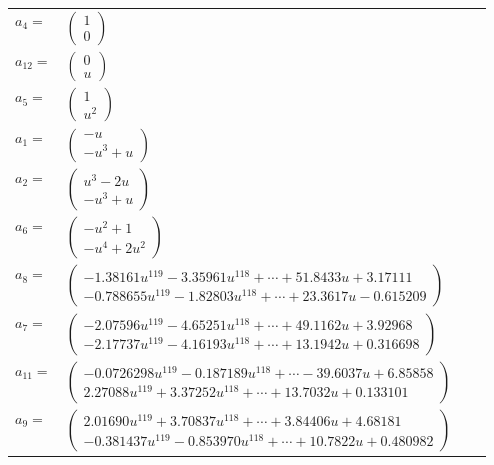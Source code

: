 \documentclass[1p]{elsarticle_modified}
\theoremstyle{definition}
\begin{document}
\begin{tabular}{m{7pt} m{180pt} m{7pt} m{180pt} }
\flushright $a_{4}=$&$\begin{pmatrix}1\\0\end{pmatrix}$ \\
\flushright $a_{12}=$&$\begin{pmatrix}0\\u\end{pmatrix}$ \\
\flushright $a_{5}=$&$\begin{pmatrix}1\\u^2\end{pmatrix}$ \\
\flushright $a_{1}=$&$\begin{pmatrix}- u\\- u^3+u\end{pmatrix}$ \\
\flushright $a_{2}=$&$\begin{pmatrix}u^3-2 u\\- u^3+u\end{pmatrix}$ \\
\flushright $a_{6}=$&$\begin{pmatrix}- u^2+1\\- u^4+2 u^2\end{pmatrix}$ \\
\flushright $a_{8}=$&$\begin{pmatrix}-1.38161 u^{119}-3.35961 u^{118}+\cdots+51.8433 u+3.17111\\-0.788655 u^{119}-1.82803 u^{118}+\cdots+23.3617 u-0.615209\end{pmatrix}$ \\
\flushright $a_{7}=$&$\begin{pmatrix}-2.07596 u^{119}-4.65251 u^{118}+\cdots+49.1162 u+3.92968\\-2.17737 u^{119}-4.16193 u^{118}+\cdots+13.1942 u+0.316698\end{pmatrix}$ \\
\flushright $a_{11}=$&$\begin{pmatrix}-0.0726298 u^{119}-0.187189 u^{118}+\cdots-39.6037 u+6.85858\\2.27088 u^{119}+3.37252 u^{118}+\cdots+13.7032 u+0.133101\end{pmatrix}$ \\
\flushright $a_{9}=$&$\begin{pmatrix}2.01690 u^{119}+3.70837 u^{118}+\cdots+3.84406 u+4.68181\\-0.381437 u^{119}-0.853970 u^{118}+\cdots+10.7822 u+0.480982\end{pmatrix}$ \\

\end{tabular}
\end{document}
